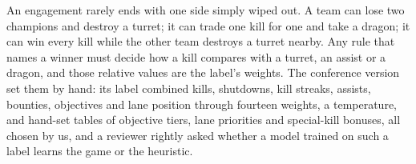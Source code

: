 An engagement rarely ends with one side simply wiped out. A team can lose two champions and destroy a
turret; it can trade one kill for one and take a dragon; it can win every kill while the other team
destroys a turret nearby. Any rule that names a winner must decide how a kill compares with a turret,
an assist or a dragon, and those relative values are the label's weights. The conference version set
them by hand: its label combined kills, shutdowns, kill streaks, assists, bounties, objectives and
lane position through fourteen weights, a temperature, and hand-set tables of objective tiers, lane
priorities and special-kill bonuses, all chosen by us, and a reviewer rightly asked whether a model
trained on such a label learns the game or the heuristic.

